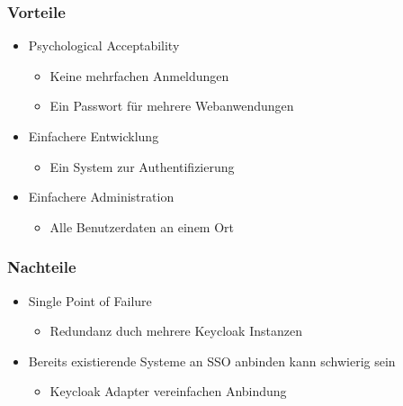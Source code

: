 \documentclass{beamer}
\begin{document}
\begin{frame}
\frametitle{Vorteile}
\begin{itemize}
\item Psychological Acceptability
\begin{itemize}
	\item Keine mehrfachen Anmeldungen
	\item Ein Passwort für mehrere Webanwendungen
\end{itemize}
\item Einfachere Entwicklung
\begin{itemize}
	\item Ein System zur Authentifizierung
\end{itemize}
\item Einfachere Administration
\begin{itemize}
	\item Alle Benutzerdaten an einem Ort
\end{itemize}
\end{itemize}
\end{frame}

\begin{frame}
\frametitle{Nachteile}
\begin{itemize}
\item Single Point of Failure
\begin{itemize}
	\item Redundanz duch mehrere Keycloak Instanzen %
\end{itemize}
\item Bereits existierende Systeme an SSO anbinden kann schwierig sein
\begin{itemize}
	\item Keycloak Adapter vereinfachen Anbindung
\end{itemize}
\end{itemize}
\end{frame}
\end{document}
